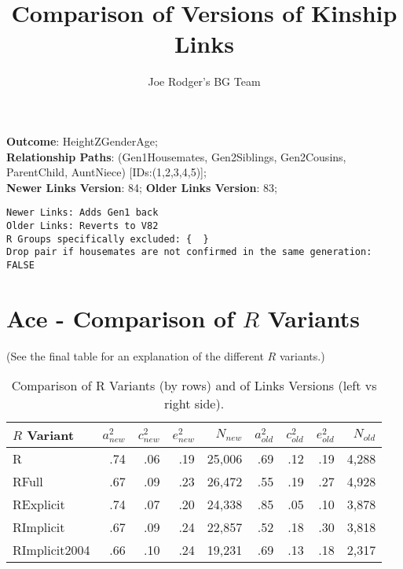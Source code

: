 \documentclass{article}\usepackage[]{graphicx}\usepackage[]{color}
\title{Comparison of Versions of Kinship Links}
\author{Joe Rodger's BG Team}
\makeatletter
\newenvironment{kframe}{%
 \def\at@end@of@kframe{}%
 \ifinner\ifhmode%
  \def\at@end@of@kframe{\end{minipage}}%
  \begin{minipage}{\columnwidth}%
 \fi\fi%
 \def\FrameCommand##1{\hskip\@totalleftmargin \hskip-\fboxsep
 \colorbox{shadecolor}{##1}\hskip-\fboxsep
     \hskip-\linewidth \hskip-\@totalleftmargin \hskip\columnwidth}%
 \MakeFramed {\advance\hsize-\width
   \@totalleftmargin\z@ \linewidth\hsize
   \@setminipage}}%
 {\par\unskip\endMakeFramed%
 \at@end@of@kframe}
\newenvironment{knitrout}{}{} %
\makeatother
\begin{document}
\maketitle
\setcounter{totalnumber}{8} %

\setlength{\parindent}{0pt}%











\textbf{Outcome}: HeightZGenderAge;\\
\textbf{Relationship Paths}: (Gen1Housemates, Gen2Siblings, Gen2Cousins, ParentChild, AuntNiece) [IDs:(1,2,3,4,5)];\\
\textbf{Newer Links Version}: 84;
\textbf{Older Links Version}: 83;

\begin{knitrout}
\color{fgcolor}\begin{kframe}
\begin{verbatim}
Newer Links: Adds Gen1 back
Older Links: Reverts to V82
R Groups specifically excluded: {  }
Drop pair if housemates are not confirmed in the same generation: FALSE
\end{verbatim}
\end{kframe}
\end{knitrout}





\section{Ace - Comparison of $R$ Variants} 
(See the final table for an explanation of the different $R$ variants.)
\begin{table}[ht]
\centering
{\large
\begin{tabular}{l|rrrr|rrrr}
  \hline
$R$ Variant & $a_{new}^2$ & $c_{new}^2$ & $e_{new}^2$ & $N_{new}$ & $a_{old}^2$ & $c_{old}^2$ & $e_{old}^2$ & $N_{old}$ \\ 
  \hline
R & .74 & .06 & .19 & 25,006 & .69 & .12 & .19 & 4,288 \\ 
  RFull & .67 & .09 & .23 & 26,472 & .55 & .19 & .27 & 4,928 \\ 
  RExplicit & .74 & .07 & .20 & 24,338 & .85 & .05 & .10 & 3,878 \\ 
  RImplicit & .67 & .09 & .24 & 22,857 & .52 & .18 & .30 & 3,818 \\ 
  RImplicit2004 & .66 & .10 & .24 & 19,231 & .69 & .13 & .18 & 2,317 \\ 
   \hline
\end{tabular}
}
\caption{Comparison of R Variants (by rows) and of Links Versions (left vs right side).} 
\end{table}
\end{document}
